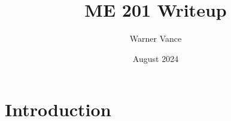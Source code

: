 \documentclass{article}
\title{ME 201 Writeup}
\author{Warner Vance}
\date{August 2024}
\begin{document}
\maketitle

\section{Introduction}
\end{document}
